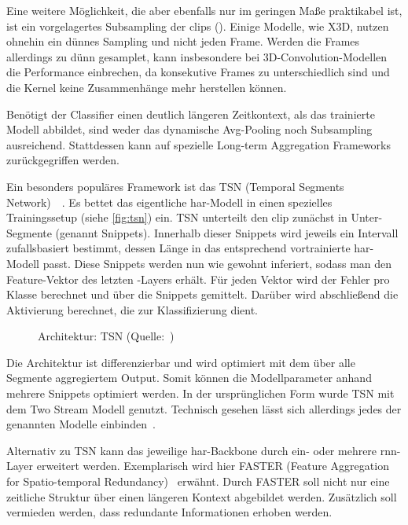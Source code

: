 Eine weitere Möglichkeit, die aber ebenfalls nur im geringen Maße praktikabel ist, ist ein vorgelagertes Subsampling der \glspl{clip} (\cite{Ng15}).
Einige Modelle, wie X3D, nutzen ohnehin ein dünnes Sampling und nicht jeden Frame.
Werden die Frames allerdings zu dünn gesamplet, kann insbesondere bei 3D-Convolution-Modellen die Performance einbrechen, da konsekutive Frames zu unterschiedlich sind und die Kernel keine Zusammenhänge mehr herstellen können.

Benötigt der Classifier einen deutlich längeren Zeitkontext, als das trainierte Modell abbildet, sind weder das dynamische Avg-Pooling noch Subsampling ausreichend.
Stattdessen kann auf spezielle Long-term Aggregation Frameworks zurückgegriffen werden.

Ein besonders populäres Framework ist das TSN (Temporal Segments Network)~\cite{Wang16}~\cite{Wang19}.
Es bettet das eigentliche \gls{har}-Modell in einen spezielles Trainingssetup (siehe \autoref{fig:tsn}) ein.
TSN unterteilt den \gls{clip} zunächst in Unter-Segmente (genannt Snippets).
Innerhalb dieser Snippets wird jeweils ein Intervall zufallsbasiert bestimmt, dessen Länge in das entsprechend vortrainierte \gls{har}-Modell passt.
Diese Snippets werden nun wie gewohnt inferiert, sodass man den Feature-Vektor des letzten \fc-Layers erhält.
Für jeden Vektor wird der Fehler pro Klasse berechnet und über die Snippets gemittelt.
Darüber wird abschließend die Aktivierung berechnet, die zur Klassifizierung dient.

\begin{figure}[h!]
    \centering
    \caption{Architektur: TSN (Quelle:~\cite{Wang19})}
    \label{fig:tsn}
\end{figure}

Die Architektur ist differenzierbar und wird optimiert mit dem über alle Segmente aggregiertem Output.
Somit können die Modellparameter anhand mehrere Snippets optimiert werden.
In der ursprünglichen Form wurde TSN mit dem Two Stream Modell genutzt.
Technisch gesehen lässt sich allerdings jedes der genannten Modelle einbinden~\cite{Kothawade19}.

Alternativ zu TSN kann das jeweilige \gls{har}-Backbone durch ein- oder mehrere \gls{rnn}-Layer erweitert werden.
Exemplarisch wird hier FASTER (Feature Aggregation for Spatio-temporal Redundancy)~\cite{Zhu19} erwähnt.
Durch FASTER soll nicht nur eine zeitliche Struktur über einen längeren Kontext abgebildet werden.
Zusätzlich soll vermieden werden, dass redundante Informationen erhoben werden.

